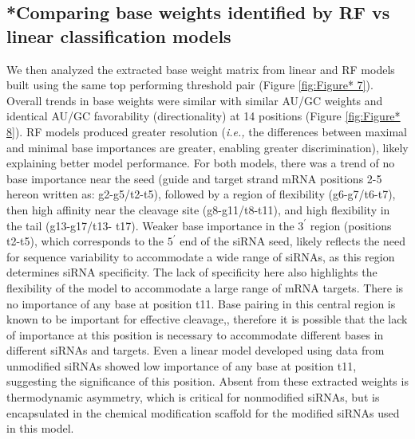 \documentclass{report}
\begin{document}
\subsection{*Comparing base weights identified by RF vs linear classification models}\label{sec:comparing base weights identified by RF vs linear classification}
We then analyzed the extracted base weight matrix from linear and RF models built using the same top performing threshold pair (Figure \ref{fig:Figure* 7}). Overall trends in base weights were similar with similar AU/GC weights and identical AU/GC favorability (directionality) at 14 positions (Figure \ref{fig:Figure* 8}). RF models produced greater resolution (\textit{i.e.,} the differences between maximal and minimal base importances are greater, enabling greater discrimination), likely explaining better model performance. For both models, there was a trend of no base importance near the seed (guide and target strand mRNA positions 2-5 hereon written as: g2-g5/t2-t5), followed by a region of flexibility (g6-g7/t6-t7), then high affinity near the cleavage site (g8-g11/t8-t11), and high flexibility in the tail (g13-g17/t13- t17). Weaker base importance in the $3^\prime$ region (positions t2-t5), which corresponds to the $5^\prime$ end of the siRNA seed, likely reflects the need for sequence variability to accommodate a wide range of siRNAs, as this region determines siRNA specificity. The lack of specificity here also highlights the flexibility of the model to accommodate a large range of mRNA targets. There is no importance of any base at position t11. Base pairing in this central region is known to be important for effective cleavage,\cite{ameres_molecular_2007, haley_kinetic_2004, wee_argonaute_2012}, therefore it is possible that the lack of importance at this position is necessary to accommodate different bases in different siRNAs and targets. Even a linear model developed using data from unmodified siRNAs showed low importance of any base at position t11,\cite{shmushkovich_functional_2018} suggesting the significance of this position. Absent from these extracted weights is thermodynamic asymmetry, which is critical for nonmodified siRNAs,\cite{reynolds_rational_2004, ichihara_thermodynamic_2007, lu_efficient_2008, shabalina_computational_2006} but is encapsulated in the chemical modification scaffold for the modified siRNAs used in this model. 
\end{document}
